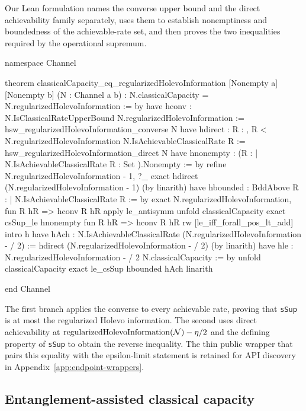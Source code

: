 \documentclass[10pt,a4paper]{article}
\newif\ifqitLineFocused
\newcommand{\qitHighlightSpan}[2]{%
	\ifnum\value{lstnumber}<#1\relax
	\else
		\ifnum\value{lstnumber}>#2\relax
		\else
			\qitLineFocusedtrue
		\fi
	\fi
}
\begin{document}
	Our Lean formulation names the converse upper bound and the direct achievability family separately, uses them to establish nonemptiness and boundedness of the achievable-rate set, and then proves the two inequalities required by the operational
	supremum.
	
\begin{qitleancode}[title={HSW capacity squeeze},
qit focus={\qitHighlightSpan{5}{11}}]
namespace Channel

theorem classicalCapacity_eq_regularizedHolevoInformation
    [Nonempty a] [Nonempty b] (N : Channel a b) :
    N.classicalCapacity = N.regularizedHolevoInformation := by
  have hconv : N.IsClassicalRateUpperBound N.regularizedHolevoInformation :=
    hsw_regularizedHolevoInformation_converse N
  have hdirect :
      \forall R : \mathbbR, R < N.regularizedHolevoInformation \to
        N.IsAchievableClassicalRate R :=
    hsw_regularizedHolevoInformation_direct N
  have hnonempty :
      ({R : \mathbbR | N.IsAchievableClassicalRate R} : Set \mathbbR).Nonempty := by
    refine \langle N.regularizedHolevoInformation - 1, ?_\rangle
    exact hdirect (N.regularizedHolevoInformation - 1) (by linarith)
  have hbounded : BddAbove {R : \mathbbR | N.IsAchievableClassicalRate R} := by
    exact \langle N.regularizedHolevoInformation, fun R hR => hconv R hR\rangle
  apply le_antisymm
  \cdot unfold classicalCapacity
    exact csSup_le hnonempty fun R hR => hconv R hR
  \cdot rw [le_iff_forall_pos_lt_add]
    intro \eta h\eta
    have hAch :
        N.IsAchievableClassicalRate
          (N.regularizedHolevoInformation - \eta / 2) :=
      hdirect (N.regularizedHolevoInformation - \eta / 2) (by linarith)
    have hle :
        N.regularizedHolevoInformation - \eta / 2 \le N.classicalCapacity := by
      unfold classicalCapacity
      exact le_csSup hbounded hAch
    linarith

end Channel
\end{qitleancode}
	
The first branch applies the converse to every achievable rate, proving that
\texttt{sSup} is at most the regularized Holevo information.  The second uses
direct achievability at
$\operatorname{regularizedHolevoInformation}({\cal N})-\eta/2$ and the defining
property of \texttt{sSup} to obtain the reverse inequality.  The thin public
wrapper that pairs this equality with the epsilon-limit statement is retained
for API discovery in Appendix~\ref{app:endpoint-wrappers}.

\subsection{Entanglement-assisted classical capacity}
\label{sec:ea}
\end{document}
